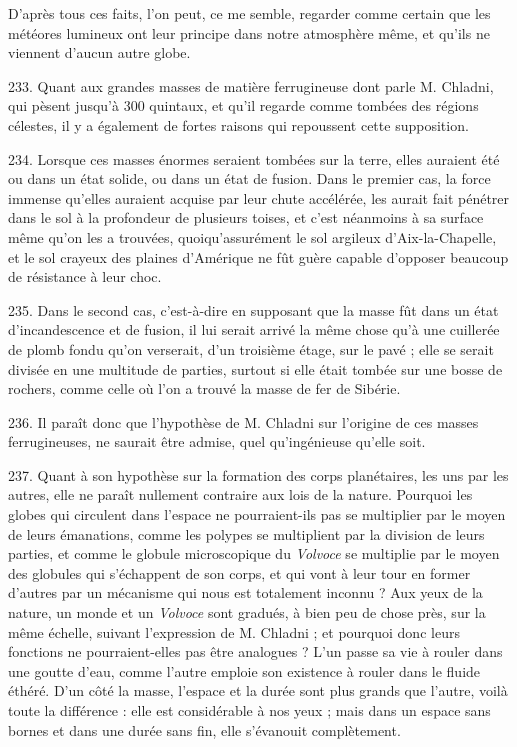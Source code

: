 \documentclass[a4paper, 11pt, oneside, polutonikogreek, french]{article}
\begin{document}
D'après tous ces faits, l'on peut, ce me semble, regarder comme certain que les météores lumineux ont leur principe dans notre atmosphère même, et qu'ils ne viennent d'aucun autre globe.

233. Quant aux grandes masses de matière ferrugineuse dont parle M. Chladni, qui pèsent jusqu'à 300 quintaux, et qu'il regarde comme tombées des régions célestes, il y a également de fortes raisons qui repoussent cette supposition.

234. Lorsque ces masses énormes seraient tombées sur la terre, elles auraient été ou dans un état solide, ou dans un état de fusion. Dans le premier cas, la force immense qu'elles auraient acquise par leur chute accélérée, les aurait fait pénétrer dans le sol à la profondeur de plusieurs toises, et c'est néanmoins à sa surface même qu'on les a trouvées, quoiqu'assurément le sol argileux d'Aix-la-Chapelle, et le sol crayeux des plaines d'Amérique ne fût guère capable d'opposer beaucoup de résistance à leur choc.

235. Dans le second cas, c'est-à-dire en supposant que la masse fût dans un état d'incandescence et de fusion, il lui serait arrivé la même chose qu'à une cuillerée de plomb fondu qu'on verserait, d'un troisième étage, sur le pavé ; elle se serait divisée en une multitude de parties, surtout si elle était tombée sur une bosse de rochers, comme celle où l'on a trouvé la masse de fer de Sibérie.

236. Il paraît donc que l'hypothèse de M. Chladni sur l'origine de ces masses ferrugineuses, ne saurait être admise, quel qu’ingénieuse qu'elle soit.

237. Quant à son hypothèse sur la formation des corps planétaires, les uns par les autres, elle ne paraît nullement contraire aux lois de la nature. Pourquoi les globes qui circulent dans l'espace ne pourraient-ils pas se multiplier par le moyen de leurs émanations, comme les polypes se multiplient par la division de leurs parties, et comme le globule microscopique du \emph{Volvoce} se multiplie par le moyen des globules qui s'échappent de son corps, et qui vont à leur tour en former d'autres par un mécanisme qui nous est totalement inconnu ? Aux yeux de la nature, un monde et un \emph{Volvoce} sont gradués, à bien peu de chose près, sur la même échelle, suivant l'expression de M. Chladni ; et pourquoi donc leurs fonctions ne pourraient-elles pas être analogues ? L'un passe sa vie à rouler dans une goutte d'eau, comme l'autre emploie son existence à rouler dans le fluide éthéré. D'un côté la masse, l'espace et la durée sont plus grands que l'autre, voilà toute la différence : elle est considérable à nos yeux ; mais dans un espace sans bornes et dans une durée sans fin, elle s'évanouit complètement.
\end{document}
